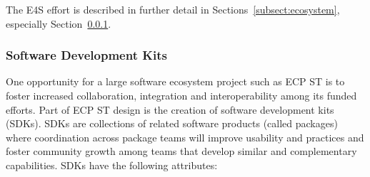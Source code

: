 The E4S effort is described in further detail in Sections~\ref{subsect:ecosystem}, especially Section~\ref{subsubsect:sdks}.

\subsubsection{Software Development Kits}\label{subsubsect:sdks}
One opportunity for a large software ecosystem project such as ECP ST is to foster increased collaboration, integration and interoperability among its funded efforts. Part of ECP ST design is the creation of software development kits (SDKs).  SDKs are collections of related software products (called packages) where coordination across package teams will improve usability and practices and foster community growth among teams that develop similar and complementary capabilities. SDKs have the following attributes:

